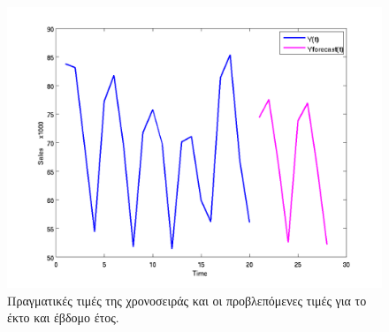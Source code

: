 \begin{figure} [ht]
  \centering
  \includegraphics[totalheight=3.2in,angle=0]{graff7.png}
  \caption{Πραγματικές τιμές της χρονοσειράς και οι προβλεπόμενες τιμές για το έκτο και έβδομο έτος.}
\end{figure}

